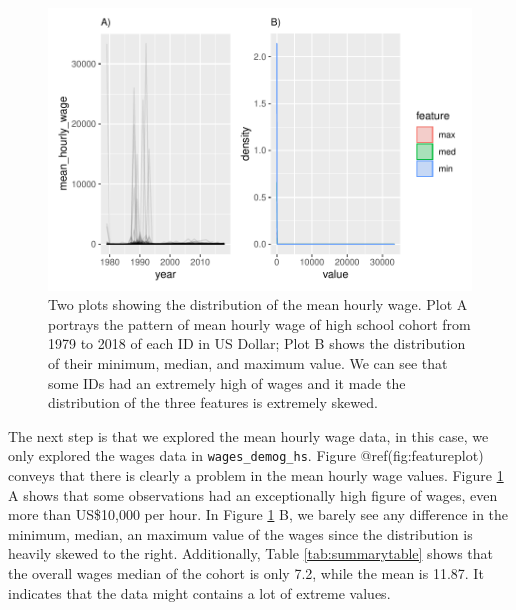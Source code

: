 \begin{Schunk}
\begin{figure}
\includegraphics{figures/featureplot-1} \caption[Two plots showing the distribution of the mean hourly wage]{Two plots showing the distribution of the mean hourly wage. Plot A portrays the pattern of mean hourly wage of high school cohort from 1979 to 2018 of each ID in US Dollar; Plot B shows the distribution of their minimum, median, and maximum value. We can see that some IDs had an extremely high of wages and it made the distribution of the three features is extremely skewed.}\label{fig:featureplot}
\end{figure}
\end{Schunk}

The next step is that we explored the mean hourly wage data, in this
case, we only explored the wages data in \texttt{wages\_demog\_hs}.
Figure @ref(fig:featureplot) conveys that there is clearly a problem in
the mean hourly wage values. Figure \ref{fig:featureplot} A shows that
some observations had an exceptionally high figure of wages, even more
than US\$10,000 per hour. In Figure \ref{fig:featureplot} B, we barely
see any difference in the minimum, median, an maximum value of the wages
since the distribution is heavily skewed to the right. Additionally,
Table \ref{tab:summarytable} shows that the overall wages median of the
cohort is only 7.2, while the mean is 11.87. It indicates that the data
might contains a lot of extreme values.

